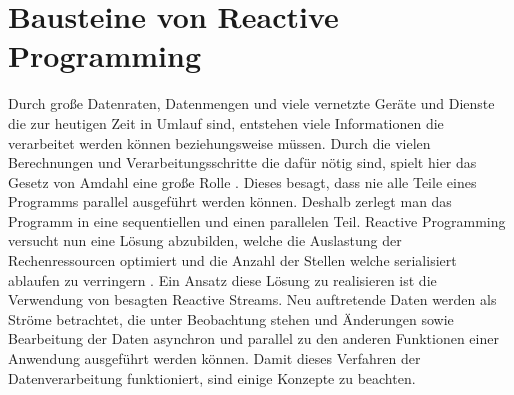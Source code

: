 \chapter{Bausteine von Reactive Programming}\label{realisierung} 
Durch große Datenraten, Datenmengen und viele vernetzte Geräte und Dienste die zur heutigen Zeit in Umlauf sind, entstehen viele Informationen die verarbeitet werden können beziehungsweise müssen. Durch die vielen Berechnungen und Verarbeitungsschritte die dafür nötig sind, spielt hier das Gesetz von Amdahl eine große Rolle \cite{Amdahl.}. Dieses besagt, dass nie alle Teile eines Programms parallel ausgeführt werden können. Deshalb zerlegt man das Programm in eine sequentiellen und einen parallelen Teil. Reactive Programming versucht nun eine Lösung abzubilden, welche die Auslastung der Rechenressourcen optimiert und die Anzahl der Stellen welche serialisiert ablaufen zu verringern \cite{Boner.}. Ein Ansatz diese Lösung zu realisieren ist die Verwendung von besagten Reactive Streams. Neu auftretende Daten werden als Ströme betrachtet, die unter Beobachtung stehen und Änderungen sowie Bearbeitung der Daten asynchron und parallel zu den anderen Funktionen einer Anwendung ausgeführt werden können. Damit dieses Verfahren der Datenverarbeitung funktioniert, sind einige Konzepte zu beachten.
